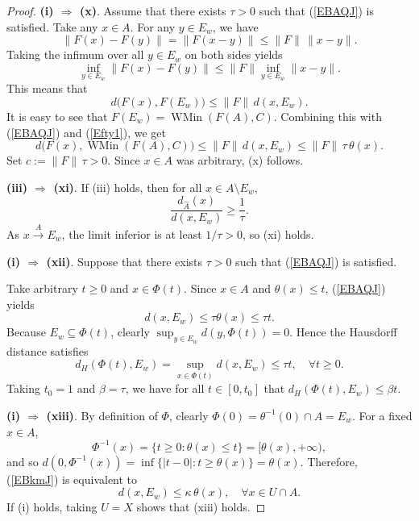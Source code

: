 \documentclass[11pt]{article}
\begin{document}
\begin{proof}
	\noindent\textbf{(i) $\Rightarrow$ (x)}.
Assume that  there exists    \(\tau > 0\) such that   (\ref{EBAQJ})  is satisfied.    Take any $x\in A$. 
For any $y\in E_w$,  we have
\[
\|F(x)-F(y)\|=\|F(x-y)\|\le\|F\|\,\|x-y\|.
\]
Taking the infimum over all $y\in E_w$ on both sides yields
\[
\inf_{y\in E_w}\|F(x)-F(y)\|\le\|F\|\inf_{y\in E_w}\|x-y\|.
\]
This means that
\begin{equation}\label{Efty1}
	d \bigl(F(x),F(E_w)\bigr)\le\|F\|\,d(x,E_w).  
\end{equation}
It is easy to see that $F(E_w)=\operatorname{WMin}(F(A),C)$.
Combining this with   (\ref{EBAQJ})  and  (\ref{Efty1}), we get
\[
d \bigl(F(x),\operatorname{WMin}(F(A),C)\bigr)\le\|F\|\,d(x,E_w)   \le\|F\|\,\tau\,\theta(x).
\]
Set $c:=\|F\|\,\tau >0$. Since $x\in A$ was arbitrary, (x) follows.	 		
	 		
	 		
	 	\noindent\textbf{(iii) $\Rightarrow$ (xi)}.
	 If (iii) holds, then for all $x\in A\setminus E_w$,
	 \[
	 \frac{d_{\widehat{A}}(x)}{d(x,E_w)}\ge\frac{1}{\tau}.
	 \]
	 As $x\xrightarrow{A} E_w$, the limit inferior is at least $1/\tau>0$, so (xi) holds.		
	 		
		 	\noindent\textbf{(i) $\Rightarrow$ (xii)}.
Suppose that  there exists \(\tau > 0\) such that   (\ref{EBAQJ})  is satisfied.

Take arbitrary \(t \ge 0\) and \(x \in \Phi(t)\). Since \(x \in A\) and \(\theta(x) \le t\),   (\ref{EBAQJ})  yields
\[
d(x, E_w) \le \tau \theta(x) \le \tau t.
\]
Because \(E_w \subseteq \Phi(t)\), clearly \(\sup_{y \in E_w} d(y, \Phi(t)) = 0\). Hence the Hausdorff distance satisfies
\[
d_H(\Phi(t), E_w) = \sup_{x \in \Phi(t)} d(x, E_w) \le \tau t, \quad \forall t \ge 0.
\]
Taking \(t_0 = 1\) and \(\beta = \tau\), we have for all \(t \in [0, t_0]\) that \(d_H(\Phi(t), E_w) \le \beta t\). 	 		
	 		
	
	\noindent\textbf{(i) $\Rightarrow$ (xiii)}.
	By definition of $\Phi$, clearly $\Phi(0)=\theta^{-1}(0)\cap A=E_w$.
	For a fixed $x\in A$,
	\[
	\Phi^{-1}(x)=\{t\ge0:\theta(x)\le t\}=[\theta(x),+\infty),
	\]
and	so $d(0,\Phi^{-1}(x))=\inf\{|t-0|:t\ge\theta(x)\}=\theta(x)$.
	Therefore,      (\ref{EBkmJ})    is equivalent to
\begin{equation}\label{EViiiD}
	d(x,E_w)\le\kappa\,\theta(x),\quad\forall x\in U\cap A.
 \end{equation}
	If (i) holds, taking $U=X$ shows that (xiii) holds.
	
	
	
	
	
	
	

\end{proof}
\end{document}
